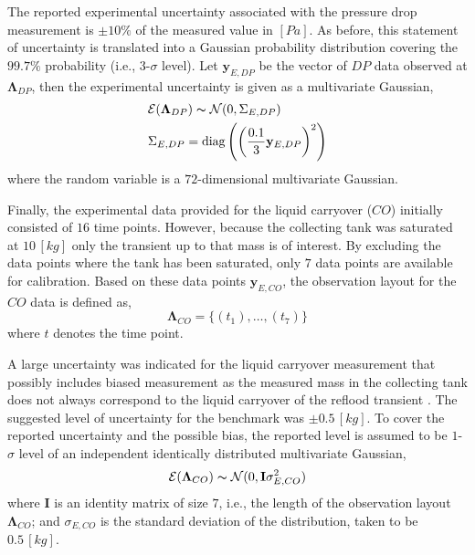 The reported experimental uncertainty associated with the pressure drop measurement is $\pm10\%$ of the measured value in $[Pa]$.
As before, this statement of uncertainty is translated into a Gaussian probability distribution covering the $99.7\%$ probability (i.e., $3$-$\sigma$ level).
Let $\mathbf{y}_{E,DP}$ be the vector of $DP$ data observed at $\boldsymbol{\Lambda}_{DP}$, then the experimental uncertainty is given as a multivariate Gaussian,
\begin{equation}
	\begin{split}
		& \mathcal{E}(\boldsymbol{\Lambda}_{DP}) \thicksim \mathcal{N}(0, \Sigma_{E,DP})\\
		& \Sigma_{E,DP} = \text{diag}\left(\left(\frac{0.1}{3}\mathbf{y}_{E,DP}\right)^2\right)
	\end{split}	
\label{eq:bc_experimental_uncertainty_feba_dp}
\end{equation}
where the random variable is a $72$-dimensional multivariate Gaussian.

Finally, the experimental data provided for the liquid carryover ($CO$) initially consisted of $16$ time points.
However, because the collecting tank was saturated at $10\,[kg]$ only the transient up to that mass is of interest.
By excluding the data points where the tank has been saturated, only $7$ data points are available for calibration.
Based on these data points $\mathbf{y}_{E,CO}$, the observation layout for the $CO$ data is defined as,
\begin{equation}
		\boldsymbol{\Lambda}_{CO}  = \{(t_1),\ldots,(t_{7})\}
\label{eq:bc_observation_layout_feba_co}
\end{equation}
where $t$ denotes the time point.

A large uncertainty was indicated for the liquid carryover measurement that possibly includes biased measurement as the measured mass in the collecting tank does not always correspond to the liquid carryover of the reflood transient \cite{Sanz2017}.
The suggested level of uncertainty for the benchmark was $\pm0.5\,[kg]$.
To cover the reported uncertainty and the possible bias, the reported level is assumed to be $1$-$\sigma$ level of an independent identically distributed multivariate Gaussian,
\begin{equation}
	\begin{split}
		& \mathcal{E}(\boldsymbol{\Lambda}_{CO}) \thicksim \mathcal{N}(0, \mathbf{I} \sigma^2_{E,CO})\\
	\end{split}
\label{eq:bc_experimental_uncertainty_feba_co}
\end{equation}
where $\mathbf{I}$ is an identity matrix of size $7$, i.e., the length of the observation layout $\boldsymbol{\Lambda}_{CO}$;
and $\sigma_{E,CO}$ is the standard deviation of the distribution, taken to be $0.5\,[kg]$.

